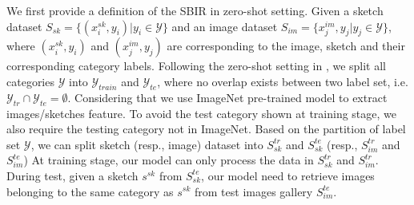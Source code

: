 \documentclass[10pt,twocolumn,letterpaper]{article}
\begin{document}
We first provide a definition of the SBIR in zero-shot setting. 
Given a sketch dataset $S_{sk}=\{(x_i^{sk}, y_i)|y_i \in \mathcal{Y}\}$ and an image dataset $S_{im}=\{x_j^{im}, y_j | y_j \in \mathcal{Y}\}$, where $(x_i^{sk}, y_i)$ and $(x_j^{im}, y_j)$ are corresponding to the image, sketch and their corresponding category labels.
Following the zero-shot setting in \cite{yelamarthi2018zero,wang2019stacked}, we split all categories $\mathcal{Y}$ into $\mathcal{Y}_{train}$ and $\mathcal{Y}_{te}$, where no overlap exists between two label set, i.e. $\mathcal{Y}_{tr} \cap \mathcal{Y}_{te} = \emptyset$. Considering that we use ImageNet pre-trained model to extract images/sketches feature. To avoid the test category shown at training stage, we also require the testing category not in ImageNet.
Based on the partition of label set $\mathcal{Y}$, we can split sketch (resp., image) dataset into $S^{tr}_{sk}$ and $S^{te}_{sk}$ (resp., $S^{tr}_{im}$ and $S^{te}_{im}$)
At training stage, our model can only process the data in $S^{tr}_{sk}$ and $S_{im}^{tr}$. 
During test, given a sketch $s^{sk}$ from $S^{te}_{sk}$, our model need to retrieve images belonging to the same category as $s^{sk}$ from test images gallery $S^{te}_{im}$.
\end{document}
